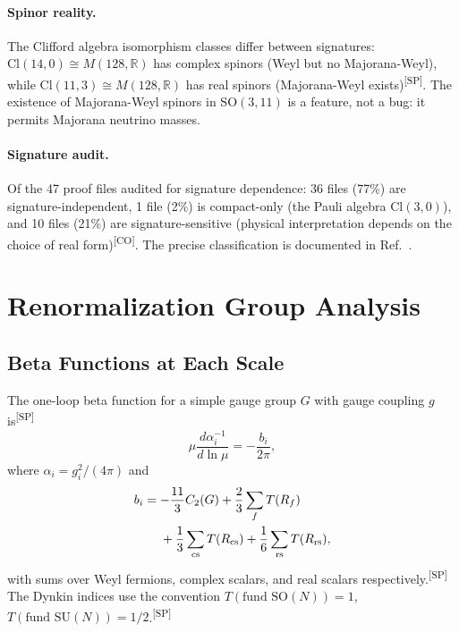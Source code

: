 \documentclass[aps,prd,twocolumn,showpacs,preprintnumbers,superscriptaddress,floatfix]{revtex4-2}
\newcommand{\Cl}{\mathrm{Cl}}
\newcommand{\CO}{\textsuperscript{[CO]}}
\newcommand{\SP}{\textsuperscript{[SP]}}
\begin{document}
\paragraph{Spinor reality.}
The Clifford algebra isomorphism classes differ between
signatures: $\Cl(14,0) \cong M(128, \mathbb{R})$ has complex
spinors (Weyl but no Majorana-Weyl), while $\Cl(11,3) \cong
M(128, \mathbb{R})$ has real spinors (Majorana-Weyl
exists)\SP.  The existence of Majorana-Weyl spinors in
$\mathrm{SO}(3,11)$ is a feature, not a bug: it permits Majorana
neutrino masses.

\paragraph{Signature audit.}
Of the 47 proof files audited for signature dependence: 36 files (77\%)
are signature-independent, 1 file (2\%) is compact-only (the Pauli
algebra $\Cl(3,0)$), and 10 files (21\%) are signature-sensitive
(physical interpretation depends on the choice of real form)\CO.
The precise classification is documented in Ref.~\cite{uft-github}.

\section{Renormalization Group Analysis}
\label{sec:rg}

\subsection{Beta Functions at Each Scale}

The one-loop beta function for a simple gauge group $G$ with gauge
coupling $g$ is\SP
\begin{equation}\label{eq:beta}
  \mu \frac{d\alpha_i^{-1}}{d\ln\mu} = -\frac{b_i}{2\pi},
\end{equation}
where $\alpha_i = g_i^2 / (4\pi)$ and
\begin{align}
  b_i = {} &{-}\frac{11}{3} C_2(G) + \frac{2}{3} \sum_f T(R_f)
    \notag \\
    &+ \frac{1}{3} \sum_\text{cs} T(R_\text{cs})
    + \frac{1}{6} \sum_\text{rs} T(R_\text{rs}),
    \label{eq:bcoeff}
\end{align}
with sums over Weyl fermions, complex scalars, and real scalars
respectively.\SP{}  The Dynkin indices use the convention
$T(\text{fund SO}(N)) = 1$, $T(\text{fund SU}(N)) = 1/2$.\SP
\end{document}
